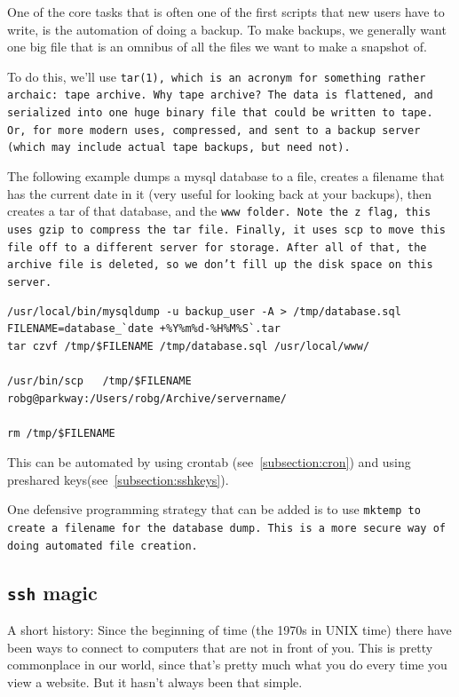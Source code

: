 One of the core tasks that is often one of the first scripts that new users
have to write, is the automation of doing a backup. To make backups, we generally
want one big file that is an omnibus of all the files we want to make a snapshot
of.

To do this, we'll use \tt{tar(1)}, which is an acronym for something rather archaic:
tape archive. Why tape archive? The data is flattened, and serialized into one huge
binary file that could be written to tape. Or, for more modern uses, compressed, and
sent to a backup server (which may include actual tape backups, but need not).

The following example dumps a mysql database to a file, creates a filename that
has the current date in it (very useful for looking back at your backups), then
creates a tar of that database, and the \tt{www} folder. Note the \tt{z} flag,
this uses \tt{gzip} to compress the tar file. Finally, it uses
\tt{scp} to move this file off to a different server for storage.  After all of that,
the archive file is deleted, so we don't fill up the disk space on this server.

\begin{verbatim}
/usr/local/bin/mysqldump -u backup_user -A > /tmp/database.sql
FILENAME=database_`date +%Y%m%d-%H%M%S`.tar
tar czvf /tmp/$FILENAME /tmp/database.sql /usr/local/www/

/usr/bin/scp   /tmp/$FILENAME robg@parkway:/Users/robg/Archive/servername/

rm /tmp/$FILENAME
\end{verbatim}

This can be automated by using crontab (see~\ref{subsection:cron}) and
using preshared keys(see~\ref{subsection:sshkeys}). 

One defensive programming strategy that can be added is to use \tt{mktemp} to
create a filename for the database dump. This is a more secure way of doing
automated file creation.  

\subsection {{\tt ssh} magic}

A short history: Since the beginning of time (the 1970s in UNIX time) there have been ways
to connect to computers that are not in front of you. This is pretty commonplace in our world, 
since that's pretty much what you do every time you view a website. But it hasn't 
always been that simple.

